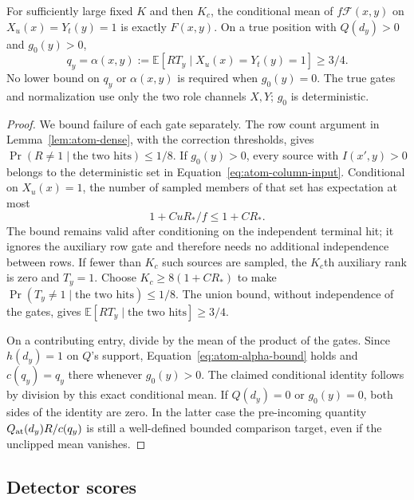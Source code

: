 \begin{lemma}
\label{lem:atom-correction}
For sufficiently large fixed $K$ and then $K_c$, the conditional mean of
$f\mathcal F(x,y)$ on $X_u(x)=Y_t(y)=1$ is exactly $F(x,y)$.
On a true position with $Q(d_y)>0$ and $g_0(y)>0$,
\begin{equation}
 q_y=\alpha(x,y):=
  \mathbb E[R T_y\mid X_u(x)=Y_t(y)=1]\ge3/4.
 \label{eq:atom-alpha-bound}
\end{equation}
No lower bound on $q_y$ or $\alpha(x,y)$ is required when $g_0(y)=0$.
The true gates and normalization use only the two role channels $X,Y$;
$g_0$ is deterministic.
\end{lemma}

\begin{proof}
We bound failure of each gate separately. The row count argument in Lemma~\ref{lem:atom-dense}, with the correction
thresholds, gives $\Pr(R\ne1\mid\text{the two hits})\le1/8$.
If $g_0(y)>0$, every source with $I(x',y)>0$ belongs to the deterministic
set in Equation~\eqref{eq:atom-column-input}.  Conditional on $X_u(x)=1$,
the number of sampled members of that set has expectation at most
\[
 1+C uR_*/f\le1+C R_*.
\]
The bound remains valid after conditioning on the independent terminal
hit; it ignores the auxiliary row gate and therefore needs no additional
independence between rows.  If fewer than $K_c$ such sources are sampled,
the $K_c$th auxiliary rank is zero and $T_y=1$.  Choose
$K_c\ge8(1+C R_*)$ to make $\Pr(T_y\ne1\mid\text{the two hits})\le1/8$.
The union bound, without independence of the gates, gives
$\mathbb E[RT_y\mid\text{the two hits}]\ge3/4$.

On a contributing entry, divide by the mean of the product of the gates. Since $h(d_y)=1$ on $Q$'s support, Equation~\eqref{eq:atom-alpha-bound}
holds and $c(q_y)=q_y$ there whenever $g_0(y)>0$.  The claimed conditional
identity follows by division by this exact conditional mean.  If
$Q(d_y)=0$ or $g_0(y)=0$, both sides of the identity are zero.  In the latter
case the pre-incoming quantity $Q_{\rm at}(d_y)R/c(q_y)$ is still a well-defined
bounded comparison target, even if the unclipped mean vanishes.
\end{proof}

\subsection{Detector scores}

